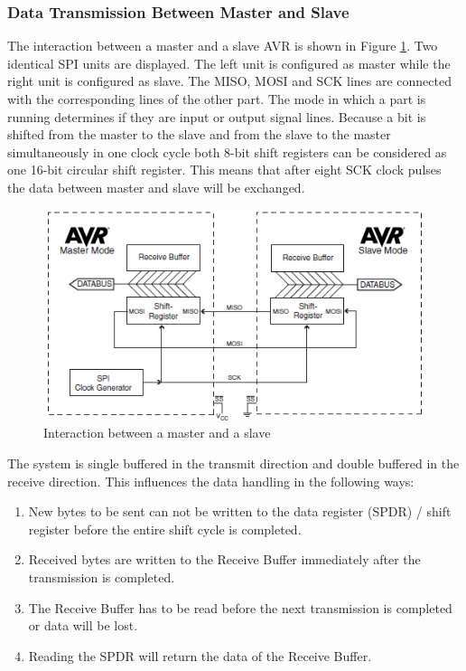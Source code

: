 \subsubsection{Data Transmission Between Master and Slave}
The interaction between a master and a slave AVR is shown in Figure \ref{fig:Interaction}. Two identical SPI units are displayed. The left unit is configured as master while the right unit is configured as slave. The MISO, MOSI and SCK lines are connected with the corresponding lines of the other part. The mode in which a part is running determines if they are input or output signal lines. Because a bit is shifted from the master to the slave and from the slave to the master simultaneously in one clock cycle both 8-bit shift registers can be considered as one 16-bit circular shift register. This means that after eight SCK clock pulses the data between master and slave will be exchanged.
\begin{figure}[htpb]
	\centering
	\includegraphics[scale=0.85]{Images/MasterandSlave.png}
	\caption{Interaction between a master and a slave}
	\label{fig:Interaction}
\end{figure}

The system is single buffered in the transmit direction and double buffered in the receive direction. This influences the data handling in the following ways:

\begin{enumerate}
	\item New bytes to be sent can not be written to the data register (SPDR) / shift register before the entire shift cycle is completed.
	\item Received bytes are written to the Receive Buffer immediately after the transmission is completed.
	\item The Receive Buffer has to be read before the next transmission is completed or data will be lost.
	\item Reading the SPDR will return the data of the Receive Buffer.
\end{enumerate}

